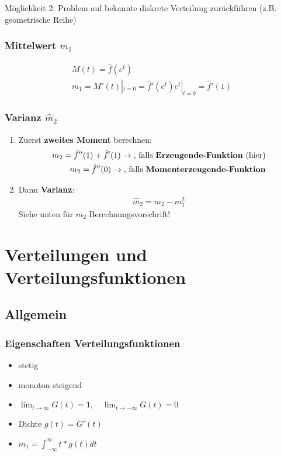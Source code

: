 \documentclass{article}
\begin{document}
M\"oglichkeit 2: Problem auf bekannte diskrete Verteilung zur\"uckf\"uhren (z.B. geometrische
Reihe)
\subsubsection{Mittelwert $m_1$}
\begin{align}
	M(t) = \hat{f}(e^t)\\
	m_1  = M'(t)|_{t=0} = \hat{f}'(e^t)e^t|_{t=0} = \hat{f}'(1)
\end{align}
\subsubsection{Varianz $\hat{m}_2$}
\begin{enumerate}
	\item Zuerst \textbf{zweites Moment} berechnen:
		\begin{align}
			m_2 = \hat{f}''(1) + \hat{f}'(1) \rightarrow \text{, falls \textbf{Erzeugende-Funktion}
			(hier)}\\
			m_2 = \hat{f}''(0) \rightarrow \text{, falls \textbf{Momenterzeugende-Funktion}}
		\end{align}
	\item Dann \textbf{Varianz}:
		\begin{align}
			\hat{m}_2 = m_2 - m_1^2
		\end{align}
		Siehe unten f\"ur $m_2$ Berechnungsvorschrift!
\end{enumerate}
\section{Verteilungen und Verteilungsfunktionen}
\subsection{Allgemein}
\subsubsection{Eigenschaften Verteilungsfunktionen}
\begin{itemize}		
	\item stetig
	\item monoton steigend
	\item $\lim_{t \to \infty} G(t) = 1, \quad \lim_{t \to -\infty} G(t) = 0$
	\item Dichte $g(t) = G'(t)$
	\item $m_1 = \int_{-\infty}^{\infty}t*g(t)dt$
\end{itemize}
\end{document}
